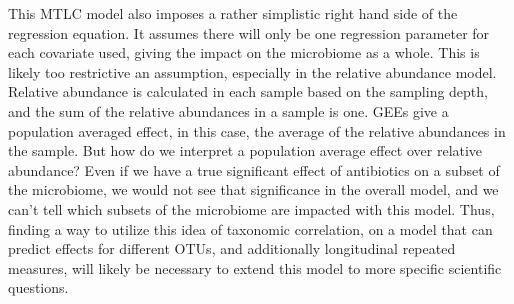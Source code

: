 \documentclass[12pt]{article}
\begin{document}
This MTLC model also imposes a rather simplistic right hand side of the regression equation. It assumes there will only be one regression parameter for each covariate used, giving the impact on the microbiome as a whole. This is likely too restrictive an assumption, especially in the relative abundance model. Relative abundance is calculated in each sample based on the sampling depth, and the sum of the relative abundances in a sample is one. GEEs give a population averaged effect, in this case, the average of the relative abundances in the sample. But how do we interpret a population average effect over relative abundance?
Even if we have a true significant effect of antibiotics on a subset of the microbiome, we would not see that significance in the overall model, and we can't tell which subsets of the microbiome are impacted with this model. Thus, finding a way to utilize this idea of taxonomic correlation, on a model that can predict effects for different OTUs, and additionally longitudinal repeated measures, will likely be necessary to extend this model to more specific scientific questions.









\begin{singlespace}
\printbibliography
\end{singlespace}
\end{document}
